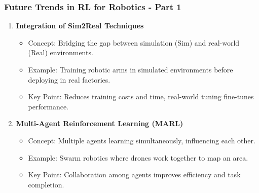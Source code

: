 \documentclass{beamer}
\begin{document}
\begin{frame}[fragile]
    \frametitle{Future Trends in RL for Robotics - Part 1}
    \begin{enumerate}
        \item \textbf{Integration of Sim2Real Techniques}
            \begin{itemize}
                \item Concept: Bridging the gap between simulation (Sim) and real-world (Real) environments.
                \item Example: Training robotic arms in simulated environments before deploying in real factories.
                \item Key Point: Reduces training costs and time, real-world tuning fine-tunes performance.
            \end{itemize}
        
        \item \textbf{Multi-Agent Reinforcement Learning (MARL)}
            \begin{itemize}
                \item Concept: Multiple agents learning simultaneously, influencing each other.
                \item Example: Swarm robotics where drones work together to map an area.
                \item Key Point: Collaboration among agents improves efficiency and task completion.
            \end{itemize}
    \end{enumerate}
\end{frame}
\end{document}
